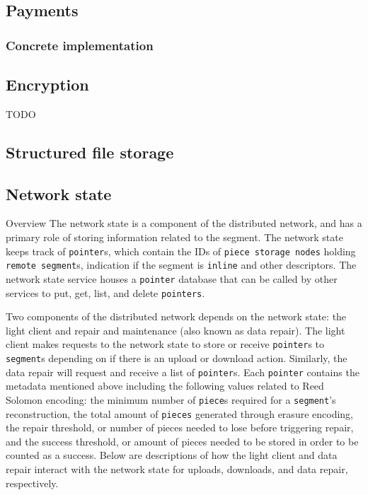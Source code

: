 \documentclass[a4paper,10pt]{article}
\newcommand{\x}[1]{{\tt #1}}
\newcommand{\todo}[1]{{\color{red} TODO #1}}
\begin{document}
\subsection{Payments}

\subsubsection{Concrete implementation}

\subsection{Encryption}

\todo{}

\subsection{Structured file storage}

\subsection{Network state}
Overview
The network state is a component of the distributed network, and has a primary
role of storing information related to the segment. The network state keeps
track of \x{pointer}s, which contain the IDs of \x{piece storage nodes} holding \x{remote
segment}s, indication if the segment is \x{inline} and other descriptors. The network
state service houses a \x{pointer} database that can be called by other services
to put, get, list, and delete \x{pointers}.

Two components of the distributed network depends on the network state: the light
client and repair and maintenance (also known as data repair). The light client
makes requests to the network state to store or receive \x{pointer}s to \x{segment}s
depending on if there is an upload or download action. Similarly, the data repair
will request and receive a list of \x{pointer}s. Each \x{pointer} contains the metadata
mentioned above including the following values related to Reed Solomon encoding: the
minimum number of \x{piece}s required for a \x{segment}'s reconstruction, the total
amount of \x{pieces} generated through erasure encoding, the repair threshold, or
number of pieces needed to lose before triggering repair, and the success threshold,
or amount of pieces needed to be stored in order to be counted as a success. Below
are descriptions of how the light client and data repair interact with the network
state for uploads, downloads, and data repair, respectively.
\end{document}
